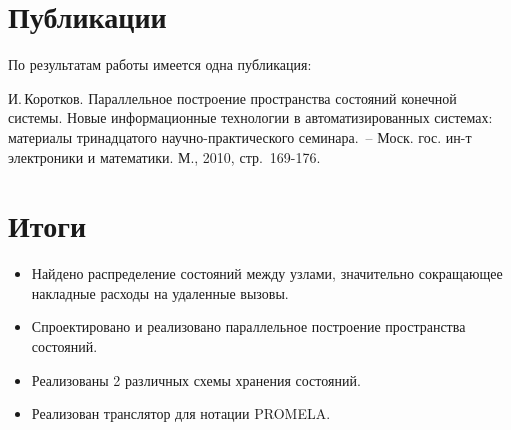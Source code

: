 \documentclass[12pt]{article}
\begin{document}
\section{Публикации}
\label{sec:publications}

По результатам работы имеется одна публикация:

И.\,Коротков. Параллельное построение пространства состояний конечной системы. Новые
информационные технологии в автоматизированных системах: материалы тринадцатого
научно-практического семинара.~-- Моск. гос. ин-т электроники и математики. М., 2010,
стр.~169-176.

\section{Итоги}
\label{sec:publications}

\small
\begin{itemize}
\item Найдено распределение состояний между узлами, значительно сокращающее накладные
  расходы на удаленные вызовы.
\item Спроектировано и реализовано параллельное построение пространства состояний.
\item Реализованы 2 различных схемы хранения состояний.
\item Реализован транслятор для нотации PROMELA.
\end{itemize}
\normalsize
\end{document}
